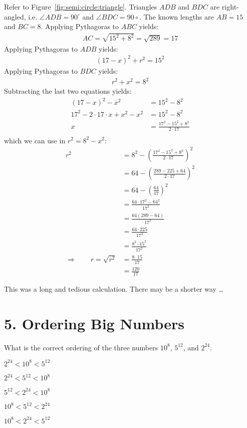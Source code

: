 \documentclass[12pt]{article}
\begin{document}
Refer to Figure~\ref{fig:semi:circle:triangle}. Triangles $ADB$ and $BDC$ are right-angled, i.e. $\angle ADB=90^{\circ}$ and $\angle BDC=90\circ$. The known lengths are $AB=15$ and $BC=8$. Applying Pythagoras to $ABC$ yields:
\begin{align*}
AC = \sqrt{15^2 + 8^2} = \sqrt{289} = 17
\end{align*}
Applying Pythagoras to $ADB$ yields:
\begin{align*}
(17-x)^2 + r^2 = 15^2
\end{align*}
Applying Pythagoras to $BDC$ yields:
\begin{align*}
r^2 + x^2 = 8^2
\end{align*}
Subtracting the last two equations yields:
\begin{align*}
(17-x)^2 - x^2 & = 15^2 - 8^2 \\
17^2 - 2 \cdot 17 \cdot x + x^2 - x^2 & = 15^2 - 8^2 \\
x & = \frac{17^2 - 15^2 + 8^2}{2 \cdot 17} \\
\end{align*}
which we can use in $r^2=8^2-x^2$:
\begin{align*}
r^2 & = 8^2 - \left(\frac{17^2 - 15^2 + 8^2}{2 \cdot 17}\right)^2 \\
& = 64 - \left(\frac{289 - 225 + 64}{2 \cdot 17}\right)^2 \\
& = 64 - \left(\frac{64}{17}\right)^2 \\
& = \frac{64 \cdot 17^2 - 64^2}{17^2} \\
& = \frac{64(289-64)}{17^2} \\
& = \frac{64 \cdot 225}{17^2} \\
& = \frac{8^2 \cdot 15^2}{17^2} \\
\Rightarrow \hspace{2em}
r = \sqrt{r^2} & = \frac{8 \cdot 15}{17} \\
  & = \frac{120}{17}
\end{align*}


This was a long and tedious calculation. There may be a shorter way \ldots 





\newpage
\section*{5. Ordering Big Numbers}
\begin{question}
What is the correct ordering of the three numbers $10^{8}$, $5^{12}$, and $2^{24}$.
\begin{enumerate*}
  \item $2^{24} < 10^{8} < 5^{12}$
  \item $2^{24} < 5^{12} < 10^{8}$
  \item $5^{12} < 2^{24} < 10^{8}$
  \item $10^{8} < 5^{12} < 2^{24}$
  \item $10^{8} < 2^{24} < 5^{12}$
\end{enumerate*}
\end{question}
\end{document}
